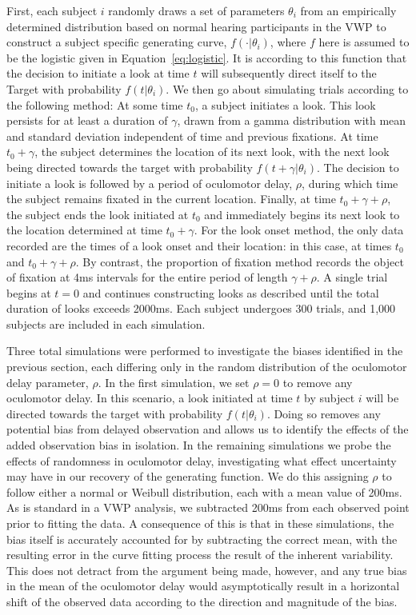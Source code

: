 First, each subject $i$ randomly draws a set of parameters $\theta_i$ from an empirically determined distribution based on normal hearing participants in the VWP \cite{FarrisTrimble2014} to construct a subject specific generating curve, $f(\cdot | \theta_i)$, where $f$ here is assumed to be the logistic given in Equation~\ref{eq:logistic}.  It is according to this function that the decision to initiate a look at time $t$ will subsequently direct itself to the Target with probability $f(t|\theta_i)$. We then go about simulating trials according to the following method: At some time $t_0$, a subject initiates a look. This look persists for at least a duration of $\gamma$, drawn from a gamma distribution with mean and standard deviation independent of time and previous fixations. At time $t_0+\gamma$, the subject determines the location of its next look, with the next look being directed towards the target with probability $f(t+\gamma | \theta_i)$. The decision to initiate a look is followed by a period of oculomotor delay, $\rho$, during which time the subject remains fixated in the current location. Finally, at time $t_0 + \gamma + \rho$, the subject ends the look initiated at $t_0$ and immediately begins its next look to the location determined at time $t_0 + \gamma$. For the look onset method, the only data recorded are the times of a look onset and their location: in this case, at times $t_0$ and $t_0 + \gamma + \rho$. By contrast, the proportion of fixation method records the object of fixation at 4ms intervals for the entire period of length $\gamma + \rho$. A single trial begins at $t = 0$ and continues constructing looks as described until the total duration of looks exceeds 2000ms. Each subject undergoes 300 trials, and 1,000 subjects are included in each simulation.

Three total simulations were performed to investigate the biases identified in the previous section, each differing only in the random distribution of the oculomotor delay parameter, $\rho$. In the first simulation, we set $\rho = 0$ to remove any oculomotor delay. In this scenario, a look initiated at time $t$ by subject $i$ will be directed towards the target with probability $f(t|\theta_i)$. Doing so removes any potential bias from delayed observation and allows us to identify the effects of the added observation bias in isolation. In the remaining simulations we probe the effects of randomness in oculomotor delay, investigating what effect uncertainty may have in our recovery of the generating function. We do this assigning $\rho$ to follow either a normal or Weibull distribution, each with a mean value of 200ms. As is standard in a VWP analysis, we subtracted 200ms from each observed point prior to fitting the data. A consequence of this is that in these simulations, the bias itself is accurately accounted for by subtracting the correct mean, with the resulting error in the curve fitting process the result of the inherent variability. This does not detract from the argument being made, however, and any true bias in the mean of the oculomotor delay would asymptotically result in a horizontal shift of the observed data according to the direction and magnitude of the bias.

